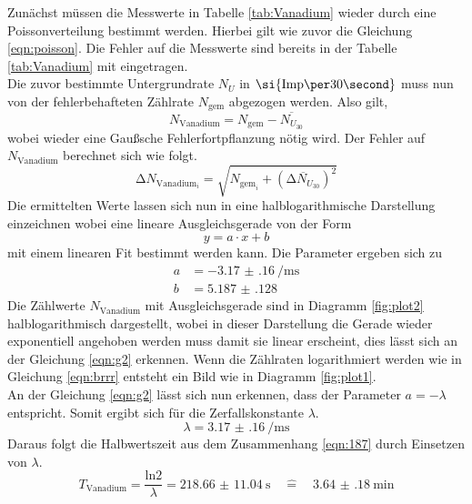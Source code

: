 Zunächst müssen die Messwerte in Tabelle \ref{tab:Vanadium} wieder durch eine Poissonverteilung bestimmt werden.
Hierbei gilt wie zuvor die Gleichung \ref{eqn:poisson}. Die Fehler auf die Messwerte sind bereits in der 
Tabelle \ref{tab:Vanadium} mit eingetragen.
\\
\newline
Die zuvor bestimmte Untergrundrate $N_{U}$ in $\si{{\text{Imp\per}{30}}\second}$ muss nun von der fehlerbehafteten Zählrate
$N_{\text{gem}}$ abgezogen werden. Also gilt,
\begin{equation}
N_{\text{Vanadium}} = N_{\text{gem}} - \overline{N_{U_{30}}}
\end{equation}
wobei wieder eine Gaußsche Fehlerfortpflanzung nötig wird. Der Fehler auf $N_{\text{Vanadium}}$ berechnet sich wie folgt.
\begin{equation}
\increment N_{{\text{Vanadium}_{i}}} = \sqrt{N_{{\text{gem}_{i}}} + (\overline{\increment N_{U_{30}}})^{2} }
\end{equation}
Die ermittelten Werte lassen sich nun in eine halblogarithmische Darstellung einzeichnen wobei eine lineare Ausgleichsgerade
von der Form
\begin{equation}
y = a \cdot x + b
\end{equation}
mit einem linearen Fit bestimmt werden kann. Die Parameter ergeben sich zu
\begin{align}
a &= \SI{-3.17(16)}{\per\milli\second} \\
b &= \SI{5.187(128)}{}
\end{align}
Die Zählwerte $N_{\text{Vanadium}}$ mit Ausgleichsgerade sind in Diagramm \ref{fig:plot2} halblogarithmisch dargestellt, wobei in dieser Darstellung die Gerade wieder exponentiell angehoben werden muss damit sie linear erscheint, dies lässt sich
an der Gleichung \eqref{eqn:g2} erkennen.
Wenn die Zählraten logarithmiert werden wie in Gleichung \eqref{eqn:brrr} entsteht ein Bild wie in Diagramm \ref{fig:plot1}.
\\
\newline
An der Gleichung \eqref{eqn:g2} lässt sich nun erkennen, dass der Parameter $a = -\lambda$ entspricht. Somit ergibt sich für die 
Zerfallskonstante $\lambda$.
\begin{equation}
\lambda = \SI{3.17(16)}{\per\milli\second} 
\end{equation}
Daraus folgt die Halbwertszeit aus dem Zusammenhang \eqref{eqn:187} durch Einsetzen von $\lambda$.
\begin{equation}
T_{\text{Vanadium}} = \frac{\text{ln}2}{\lambda} = \SI{218.66(1104)}{\second} \quad  \widehat{=} \quad \SI{3.64(18)}{\minute}
\end{equation}

